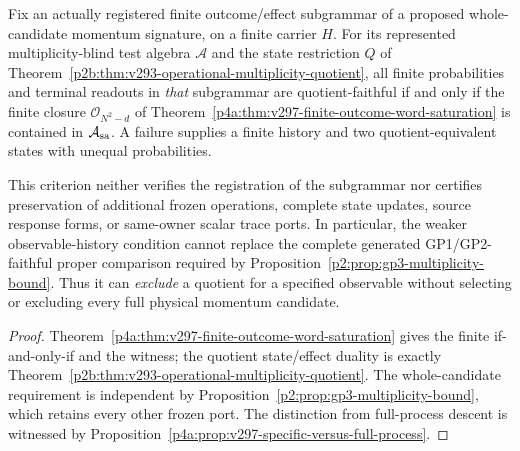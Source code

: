 \documentclass[11pt,a4paper]{article}
\begin{document}
\begin{corollary}
\label{p2f:cor:v297-outcome-history-gp3-firewall}
Fix an actually registered finite outcome/effect subgrammar of a proposed
whole-candidate momentum signature, on a finite carrier $H$. For its
represented multiplicity-blind test algebra $\mathcal A$ and the
state restriction $Q$ of
Theorem~\ref{p2b:thm:v293-operational-multiplicity-quotient},
all finite probabilities and terminal readouts in \emph{that}
subgrammar are quotient-faithful if and only if the finite closure
$\mathcal O_{N^2-d}$ of
Theorem~\ref{p4a:thm:v297-finite-outcome-word-saturation}
is contained in $\mathcal A_{\rm sa}$. A failure supplies a finite
history and two quotient-equivalent states with unequal probabilities.

This criterion neither verifies the registration of the subgrammar
nor certifies preservation of additional frozen operations, complete
state updates, source response forms, or same-owner scalar trace ports.
In particular, the weaker observable-history condition cannot replace
the complete generated GP1/GP2-faithful proper comparison required by
Proposition~\ref{p2:prop:gp3-multiplicity-bound}. Thus it can
\emph{exclude} a quotient for a specified observable without selecting
or excluding every full physical momentum candidate.
\end{corollary}
\begin{proof}
Theorem~\ref{p4a:thm:v297-finite-outcome-word-saturation} gives the
finite if-and-only-if and the witness; the quotient state/effect duality
is exactly Theorem~\ref{p2b:thm:v293-operational-multiplicity-quotient}.
The whole-candidate requirement is independent by
Proposition~\ref{p2:prop:gp3-multiplicity-bound}, which retains every
other frozen port. The distinction from full-process descent is
witnessed by Proposition~\ref{p4a:prop:v297-specific-versus-full-process}.
\end{proof}
\end{document}
